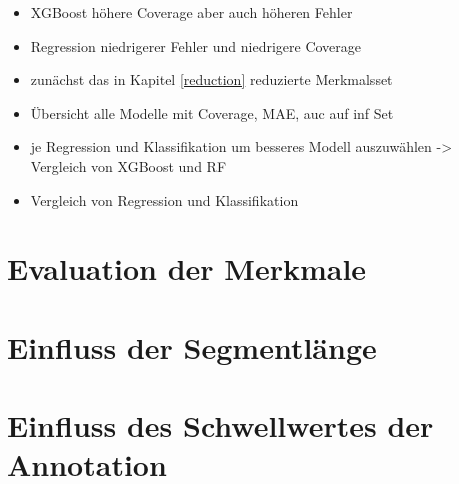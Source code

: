 	\begin{itemize}
		\item \ac{XGBoost} höhere Coverage aber auch höheren Fehler
		\item Regression niedrigerer Fehler und niedrigere Coverage
	\end{itemize}
	
	\begin{itemize}
		\item zunächst das in Kapitel \ref{reduction} reduzierte Merkmalsset
		\item Übersicht alle Modelle mit Coverage, MAE, auc auf inf Set
		\item je Regression und Klassifikation um besseres Modell auszuwählen -> Vergleich von XGBoost und RF
		\item Vergleich von Regression und Klassifikation
	\end{itemize}
	
	\section{Evaluation der Merkmale}

	\section{Einfluss der Segmentlänge}

	\section{Einfluss des Schwellwertes der Annotation}